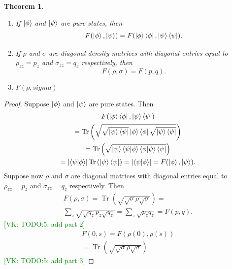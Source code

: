 \documentclass[american,aps,pra,reprint,floatfix,nofootinbib,superscriptaddress]{revtex4-2}
\DeclareMathOperator{\Tr}{Tr}
\newcommand{\abs}[1]{\left|#1\right|}
\newtheorem{theorem}{Theorem}
\newcommand{\VK}[1]{\textcolor{green}{[VK: #1]}}
\begin{document}
\begin{theorem}
  \begin{enumerate}
    \item If $\ket{\phi}$ and $\ket{\psi}$ are pure states, then
      \begin{equation}
        F(\ket{\phi}, \ket{\psi}) =
          F(\ket{\phi}\bra{\phi}, \ket{\psi}\bra{\psi}).
      \end{equation}
    \item If $\rho$ and $\sigma$ are diagonal density matrices with diagonal entries
      equal to $\rho_{zz} = p_z$ and $\sigma_{zz} = q_z$ respectively, then
      \begin{equation}
        F(\rho, \sigma) = F(p, q).
      \end{equation}
    \item $F(\rho, sigma)$
  \end{enumerate}
\end{theorem}
\begin{proof}
  Suppose $\ket{\phi}$ and $\ket{\psi}$ are pure states. Then
  \begin{multline}
    F(\ket{\phi}\bra{\phi}, \ket{\psi}\bra{\psi}) \\ 
    = \Tr\left(
      \sqrt{\sqrt{\ket{\psi}\bra{\psi}}\ket{\phi}\bra{\phi}
      \sqrt{\ket{\psi}\bra{\psi}}}
    \right) \\
    = \Tr\left(
      \sqrt{\ket{\psi}\braket{\psi|\phi}\braket{\phi|\psi}\bra{\psi}}
    \right) \\
    = \abs{\braket{\psi|\phi}} \Tr\left(\ket{\psi}\bra{\psi}\right)
    = \abs{\braket{\psi|\phi}}
    = F(\ket{\phi}, \ket{\psi}).
  \end{multline}
  Suppose now $\rho$ and $\sigma$ are diagonal matrices with diagonal entries
  equal to $\rho_{zz} = p_z$ and $\sigma_{zz} = q_z$ respectively. Then
  \begin{multline}
    F(\rho, \sigma) = \Tr\left(\sqrt{\sqrt{\sigma}\rho\sqrt{\sigma}}\right) = \\
    \sum_z \sqrt{\sqrt{q_z} p_z \sqrt{q_z}} = \sum_z \sqrt{p_z q_z} = F(p, q).
  \end{multline}
  \VK{TODO:5: add part 2}
  \begin{multline}
    F(0, s) = F(\rho(0), \rho(s)) \\
    = \Tr\left(\sqrt{\sqrt{\sigma}\rho\sqrt{\sigma}}\right)
  \end{multline}
  \VK{TODO:5: add part 3}
\end{proof}
\end{document}
